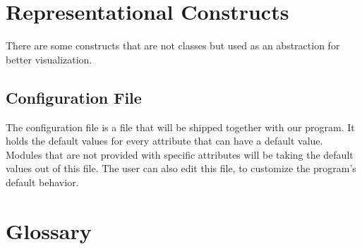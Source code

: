 \documentclass[parskip=full]{scrartcl}
\begin{document}
\section{Representational Constructs}
There are some constructs that are not classes but used as an abstraction for better visualization.


\subsection{Configuration File}
The configuration file is a file that will be shipped together with our program.
It holds the default values for every attribute that can have a default value.
Modules that are not provided with specific attributes will be taking the default values out of this file.
The user can also edit this file, to customize the program's default behavior.


\newpage
\section{Glossary}

\printnoidxglossaries
\end{document}
